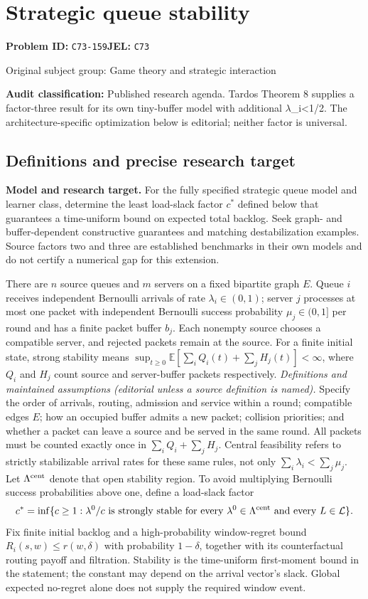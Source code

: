 \documentclass[11pt,a4paper]{article}
\begin{document}
\section*{Strategic queue stability}
\textbf{Problem ID:} \texttt{C73-159}\quad \textbf{JEL:} \texttt{C73}\par
\label{problem:OP-0286}
{\sffamily\small\color{muted}Original subject group: Game theory and strategic interaction\par}
\label{definitions:problem:30007568}
\textbf{Audit classification:} Published research agenda. Tardos Theorem 8 supplies a factor-three result for its own tiny-buffer model with additional \ensuremath{\lambda}\_i<1/2. The architecture-specific optimization below is editorial; neither factor is universal.
\subsection*{Definitions and precise research target}
\textbf{Model and research target.} For the fully specified strategic queue model and learner class, determine the least load-slack factor \(c^*\) defined below that guarantees a time-uniform bound on expected total backlog. Seek graph- and buffer-dependent constructive guarantees and matching destabilization examples. Source factors two and three are established benchmarks in their own models and do not certify a numerical gap for this extension.

There are \(n\) source queues and \(m\) servers on a fixed bipartite graph \(E\). Queue \(i\) receives independent Bernoulli arrivals of rate \(\lambda_i\in(0,1)\); server \(j\) processes at most one packet with independent Bernoulli success probability \(\mu_j\in(0,1]\) per round and has a finite packet buffer \(b_j\). Each nonempty source chooses a compatible server, and rejected packets remain at the source. For a finite initial state, strong stability means \(\sup_{t\ge0}\mathbb E[\sum_iQ_i(t)+\sum_jH_j(t)]<\infty\), where \(Q_i\) and \(H_j\) count source and server-buffer packets respectively. \emph{Definitions and maintained assumptions (editorial unless a source definition is named).} Specify the order of arrivals, routing, admission and service within a round; compatible edges \(E\); how an occupied buffer admits a new packet; collision priorities; and whether a packet can leave a source and be served in the same round. All packets must be counted exactly once in \(\sum_iQ_i+\sum_jH_j\). Central feasibility refers to strictly stabilizable arrival rates for these same rules, not only \(\sum_i\lambda_i<\sum_j\mu_j\). Let \(\Lambda^{\rm cent}\) denote that open stability region. To avoid multiplying Bernoulli success probabilities above one, define a load-slack factor
\[c^* = \inf\{c\ge1:\lambda^0/c\text{ is strongly stable for every }\lambda^0\in\Lambda^{\rm cent}\text{ and every }L\in\mathcal L\}.\]
Fix finite initial backlog and a high-probability window-regret bound \(R_i(s,w)\le r(w,\delta)\) with probability \(1-\delta\), together with its counterfactual routing payoff and filtration. Stability is the time-uniform first-moment bound in the statement; the constant may depend on the arrival vector’s slack. Global expected no-regret alone does not supply the required window event.
\end{document}
